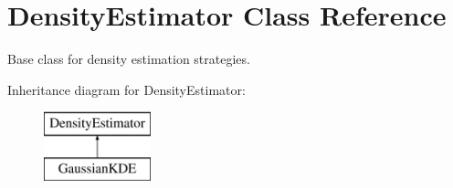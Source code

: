 \section{Density\+Estimator Class Reference}
\label{classPecos_1_1DensityEstimator}


Base class for density estimation strategies.  


Inheritance diagram for Density\+Estimator\+:\begin{figure}[H]
\begin{center}
\leavevmode
\includegraphics[height=2.000000cm]{classPecos_1_1DensityEstimator}
\end{center}
\end{figure}
